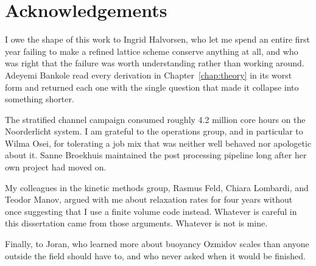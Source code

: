 \chapter*{Acknowledgements}

I owe the shape of this work to Ingrid Halvorsen, who let me spend an entire
first year failing to make a refined lattice scheme conserve anything at all,
and who was right that the failure was worth understanding rather than working
around. Adeyemi Bankole read every derivation in Chapter~\ref{chap:theory} in
its worst form and returned each one with the single question that made it
collapse into something shorter.

The stratified channel campaign consumed roughly 4.2 million core hours on the
Noorderlicht system. I am grateful to the operations group, and in particular to
Wilma Osei, for tolerating a job mix that was neither well behaved nor
apologetic about it. Sanne Broekhuis maintained the post processing pipeline
long after her own project had moved on.

My colleagues in the kinetic methods group, Rasmus Feld, Chiara Lombardi, and
Teodor Manov, argued with me about relaxation rates for four years without once
suggesting that I use a finite volume code instead. Whatever is careful in this
dissertation came from those arguments. Whatever is not is mine.

Finally, to Joran, who learned more about buoyancy Ozmidov scales than anyone
outside the field should have to, and who never asked when it would be finished.
